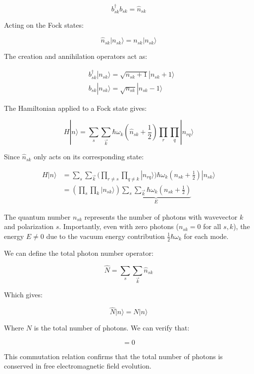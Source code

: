 \documentclass[10pt]{article}
\begin{document}
\begin{equation*}
b_{sk}^\dagger b_{sk}=\hat{n}_{sk} \tag{15.22}
\end{equation*}

Acting on the Fock states:

\begin{equation*}
\hat{n}_{sk}|n_{sk}\rangle=n_{sk}|n_{sk}\rangle \tag{15.23}
\end{equation*}

The creation and annihilation operators act as:

\begin{align*}
&b_{sk}^\dagger|n_{sk}\rangle=\sqrt{n_{sk}+1}|n_{sk}+1\rangle \tag{15.24}\\
&b_{sk}|n_{sk}\rangle=\sqrt{n_{sk}}|n_{sk}-1\rangle
\end{align*}

The Hamiltonian applied to a Fock state gives:

\begin{equation*}
H|n\rangle=\sum_s\sum_{\vec{k}}\hbar\omega_k(\hat{n}_{sk}+\frac{1}{2})\prod_r\prod_q|n_{rq}\rangle \tag{15.25}
\end{equation*}

Since $\hat{n}_{sk}$ only acts on its corresponding state:

\begin{align*}
H|n\rangle&=\sum_s\sum_{\vec{k}}(\prod_{r\neq s}\prod_{q\neq k}|n_{rq}\rangle)\hbar\omega_k(n_{sk}+\frac{1}{2})|n_{sk}\rangle\\
&=(\prod_s\prod_k|n_{sk}\rangle)\underbrace{\sum_s\sum_{\vec{k}}\hbar\omega_k(n_{sk}+\frac{1}{2})}_E \tag{15.26}
\end{align*}

The quantum number $n_{sk}$ represents the number of photons with wavevector $k$ and polarization $s$. Importantly, even with zero photons ($n_{sk}=0$ for all $s,k$), the energy $E\neq 0$ due to the vacuum energy contribution $\frac{1}{2}\hbar\omega_k$ for each mode.

We can define the total photon number operator:

\begin{equation*}
\hat{N}=\sum_s\sum_{\vec{k}}\hat{n}_{sk} \tag{15.27}
\end{equation*}

Which gives:

\begin{equation*}
\hat{N}|n\rangle=N|n\rangle \tag{15.28}
\end{equation*}

Where $N$ is the total number of photons. We can verify that:

\begin{equation*}
[\hat{N},H]=0 \tag{15.29}
\end{equation*}

This commutation relation confirms that the total number of photons is conserved in free electromagnetic field evolution.
\end{document}
